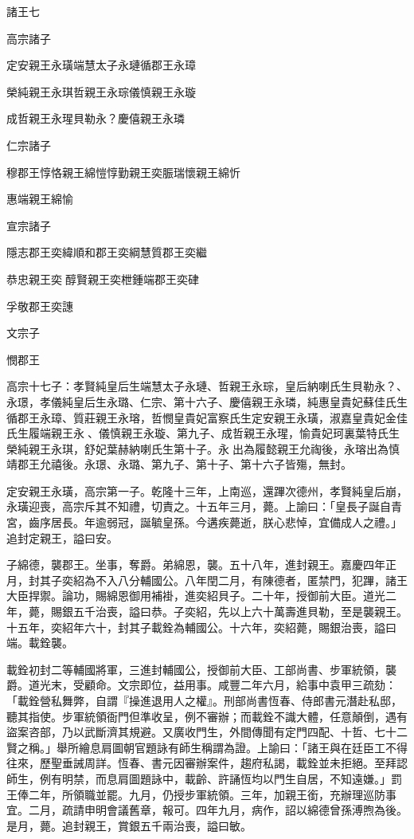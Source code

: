 
\begin{pinyinscope}
諸王七

高宗諸子

定安親王永璜端慧太子永璉循郡王永璋

榮純親王永琪哲親王永琮儀慎親王永璇

成哲親王永瑆貝勒永？慶僖親王永璘

仁宗諸子

穆郡王惇恪親王綿愷惇勤親王奕脤瑞懷親王綿忻

惠端親王綿愉

宣宗諸子

隱志郡王奕緯順和郡王奕綱慧質郡王奕繼

恭忠親王奕醇賢親王奕枻鍾端郡王奕硉

孚敬郡王奕譓

文宗子

憫郡王

高宗十七子：孝賢純皇后生端慧太子永璉、哲親王永琮，皇后納喇氏生貝勒永？、永璟，孝儀純皇后生永璐、仁宗、第十六子、慶僖親王永璘，純惠皇貴妃蘇佳氏生循郡王永璋、質莊親王永瑢，哲憫皇貴妃富察氏生定安親王永璜，淑嘉皇貴妃金佳氏生履端親王永、儀慎親王永璇、第九子、成哲親王永瑆，愉貴妃珂裏葉特氏生榮純親王永琪，舒妃葉赫納喇氏生第十子。永出為履懿親王允祹後，永瑢出為慎靖郡王允禧後。永璟、永璐、第九子、第十子、第十六子皆殤，無封。

定安親王永璜，高宗第一子。乾隆十三年，上南巡，還蹕次德州，孝賢純皇后崩，永璜迎喪，高宗斥其不知禮，切責之。十五年三月，薨。上諭曰：「皇長子誕自青宮，齒序居長。年逾弱冠，誕毓皇孫。今遘疾薨逝，朕心悲悼，宜備成人之禮。」追封定親王，謚曰安。

子綿德，襲郡王。坐事，奪爵。弟綿恩，襲。五十八年，進封親王。嘉慶四年正月，封其子奕紹為不入八分輔國公。八年閏二月，有陳德者，匿禁門，犯蹕，諸王大臣捍禦。論功，賜綿恩御用補褂，進奕紹貝子。二十年，授御前大臣。道光二年，薨，賜銀五千治喪，謚曰恭。子奕紹，先以上六十萬壽進貝勒，至是襲親王。十五年，奕紹年六十，封其子載銓為輔國公。十六年，奕紹薨，賜銀治喪，謚曰端。載銓襲。

載銓初封二等輔國將軍，三進封輔國公，授御前大臣、工部尚書、步軍統領，襲爵。道光末，受顧命。文宗即位，益用事。咸豐二年六月，給事中袁甲三疏劾：「載銓營私舞弊，自謂『操進退用人之權』。刑部尚書恆春、侍郎書元潛赴私邸，聽其指使。步軍統領衙門但準收呈，例不審辦；而載銓不識大體，任意顛倒，遇有盜案咨部，乃以武斷濟其規避。又廣收門生，外間傳聞有定門四配、十哲、七十二賢之稱。」舉所繪息肩圖朝官題詠有師生稱謂為證。上諭曰：「諸王與在廷臣工不得往來，歷聖垂誡周詳。恆春、書元因審辦案件，趨府私謁，載銓並未拒絕。至拜認師生，例有明禁，而息肩圖題詠中，載齡、許誦恆均以門生自居，不知遠嫌。」罰王俸二年，所領職並罷。九月，仍授步軍統領。三年，加親王銜，充辦理巡防事宜。二月，疏請申明會議舊章，報可。四年九月，病作，詔以綿德曾孫溥煦為後。是月，薨。追封親王，賞銀五千兩治喪，謚曰敏。


\end{pinyinscope}
